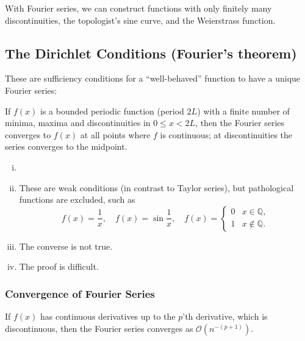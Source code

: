 \documentclass[12pt]{article}
\begin{document}
With Fourier series, we can construct functions with only finitely many discontinuities, the topologist's sine curve, and the Weierstrass function.

\subsection{The Dirichlet Conditions (Fourier's theorem)}%
\label{sub:the_dirichlet_conditions_fourier_s_theorem_}

These are sufficiency conditions for a ``well-behaved'' function to have a unique Fourier series:

\begin{proposition}
	If $f(x)$ is a bounded periodic function (period $2L$) with a finite number of minima, maxima and discontinuities in $0 \leq x < 2L$, then the Fourier series converges to  $f(x)$ at all points where $f$ is continuous; at discontinuities the series converges to the midpoint.
\end{proposition}

\begin{remark}
	\begin{enumerate}[(i)]
		\item[]
		\item These are weak conditions (in contrast to Taylor series), but pathological functions are excluded, such as
			\[
				f(x) = \frac{1}{x}, \quad f(x) = \sin \frac{1}{x}, \quad f(x) =
				\begin{cases}
					0 & x \in \mathbb{Q},\\
					1 & x \not \in \mathbb{Q}.
				\end{cases}
			\]
		\item The converse is not true.
		\item The proof is difficult.
	\end{enumerate}
	
\end{remark}

\subsubsection{Convergence of Fourier Series}%
\label{subsub:convergence_of_fourier_series}

\begin{theorem}
	If $f(x)$ has continuous derivatives up to the $p$'th derivative, which is discontinuous, then the Fourier series converges as $\mathcal{O}(n^{-(p+1)})$.
\end{theorem}
\end{document}
